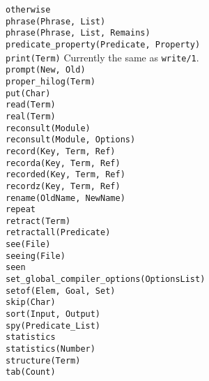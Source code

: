 \begin{tabbing}
 \> {\tt otherwise}		\>					\\
 \> {\tt phrase(Phrase, List)}	\>					\\
 \> {\tt phrase(Phrase, List, Remains)}	\>				\\
 \> {\tt predicate\_property(Predicate, Property)} \>			\\
 \> {\tt print(Term)}		\> Currently the same as {\tt write/1}.	\\
 \> {\tt prompt(New, Old)}	\>					\\
 \> {\tt proper\_hilog(Term)}	\>					\\
 \> {\tt put(Char)}		\>					\\
 \> {\tt read(Term)}		\>					\\
 \> {\tt real(Term)}		\>					\\
 \> {\tt reconsult(Module)}	\>					\\
 \> {\tt reconsult(Module, Options)} \>					\\
 \> {\tt record(Key, Term, Ref)} \>					\\
 \> {\tt recorda(Key, Term, Ref)} \>					\\
 \> {\tt recorded(Key, Term, Ref)} \>					\\
 \> {\tt recordz(Key, Term, Ref)} \>					\\
 \> {\tt rename(OldName, NewName)} \>					\\
 \> {\tt repeat}		\>					\\
 \> {\tt retract(Term)}		\>					\\
 \> {\tt retractall(Predicate)}	\>					\\
 \> {\tt see(File)}		\>					\\
 \> {\tt seeing(File)}		\>					\\
 \> {\tt seen}			\>					\\
 \> {\tt set\_global\_compiler\_options(OptionsList)} \>			\\
 \> {\tt setof(Elem, Goal, Set)} \>					\\
 \> {\tt skip(Char)}		\>					\\
 \> {\tt sort(Input, Output)}	\>					\\
 \> {\tt spy(Predicate\_List)}	\>					\\
 \> {\tt statistics}		\>					\\
 \> {\tt statistics(Number)}	\>					\\
 \> {\tt structure(Term)}	\>					\\
 \> {\tt tab(Count)}		\>					\\

\end{tabbing}
